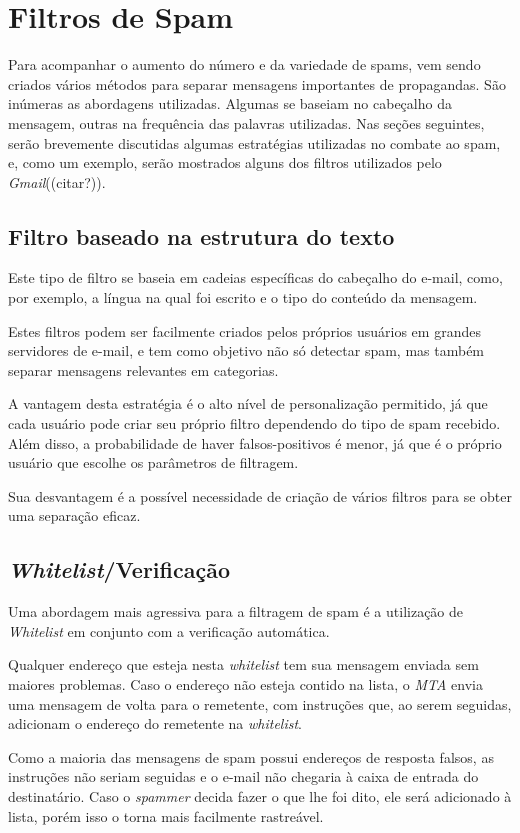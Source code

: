 \documentclass[a4paper,dvipdfm]{article}
\begin{document}
\section{Filtros de Spam}
	Para acompanhar o aumento do número e da variedade de spams, vem sendo criados vários métodos para separar mensagens importantes de propagandas.
	São inúmeras as abordagens utilizadas. 
	Algumas se baseiam no \gls{cabeçalho} da mensagem, outras na frequência das palavras utilizadas.
	Nas seções seguintes, serão brevemente discutidas algumas estratégias utilizadas no combate ao spam, e, como um exemplo, serão mostrados alguns dos filtros utilizados pelo \emph{Gmail}((citar?)).

	\subsection{Filtro baseado na estrutura do texto}
		Este tipo de filtro se baseia em cadeias específicas do cabeçalho do e-mail, como, por exemplo, a língua na qual foi escrito e o tipo do conteúdo da mensagem.

		Estes filtros podem ser facilmente criados pelos próprios usuários em grandes servidores de e-mail, e tem como objetivo não só detectar spam, mas também separar mensagens relevantes em categorias.

		A vantagem desta estratégia é o alto nível de personalização permitido, já que cada usuário pode criar seu próprio filtro dependendo do tipo de spam recebido. 
		Além disso, a probabilidade de haver falsos-positivos é menor, já que é o próprio usuário que escolhe os parâmetros de filtragem.
		
		Sua desvantagem é a possível necessidade de criação de vários filtros para se obter uma separação eficaz.


	\subsection{\emph{Whitelist}/Verificação}
		Uma abordagem mais agressiva para a filtragem de spam é a utilização de \emph{Whitelist} em conjunto com a verificação automática.

		Qualquer endereço que esteja nesta \emph{whitelist} tem sua mensagem enviada sem maiores problemas.
		Caso o endereço não esteja contido na lista, o \emph{MTA} envia uma mensagem de volta para o remetente, com instruções que, ao serem seguidas, adicionam o endereço do remetente na \emph{whitelist}.

		Como a maioria das mensagens de spam possui endereços de resposta falsos, as instruções não seriam seguidas e o e-mail não chegaria à caixa de entrada do destinatário.
		Caso o \emph{spammer} decida fazer o que lhe foi dito, ele será adicionado à lista, porém isso o torna mais facilmente rastreável.
		
\end{document}
